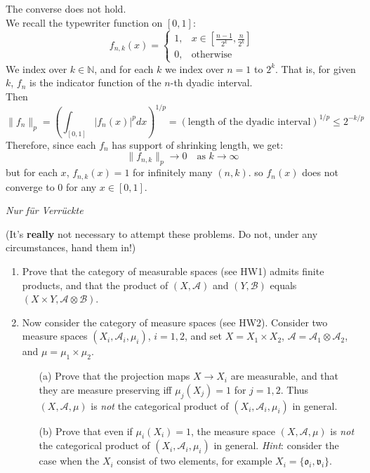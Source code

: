 \documentclass[lang=cn,11pt]{elegantbook}
\begin{document}
\begin{solution}
    The converse does not hold.\\
  We recall the typewriter function on $[0,1]$:
\[
f_{n,k}(x) = \begin{cases}
1, & x \in \left[\frac{n-1}{2^k}, \frac{n}{2^k}\right] \\
0, & \text{otherwise}
\end{cases}
\]
We index over $k \in \mathbb{N}$, and for each $k$ we index over $n=1$ to $2^k$. That is, for given $k$, \( f_n \) is the indicator function of the \( n \)-th dyadic interval.\\
Then \[
\|f_n\|_p = \left( \int_{[0,1]} |f_n(x)|^p dx \right)^{1/p} = \left( \text{length of the dyadic interval} \right)^{1/p} \le 2^{-k/p}
\]
Therefore, since each \( f_n \) has support of shrinking length, we get:
\[
\|f_{n,k}\|_p \to 0 \quad \text{as } k \to \infty
\]
but for each $x$, $f_{n,k}(x) = 1 $ for infinitely many $(n,k)$. so \( f_n(x) \) does not converge to 0 for any \( x \in [0,1] \).
  \end{solution}





\begin{center}
  \textit{Nur f\"ur Verr\"uckte}
\end{center}
(It's \textbf{really} not necessary to attempt these problems. Do not, under any circumstances, hand them in!)
\begin{enumerate}
\item Prove that the category of measurable spaces (see HW1) admits finite products, and that the product of $(X,\mathcal{A})$ and $(Y,\mathcal{B})$ equals $(X\times Y,\mathcal{A}\otimes\mathcal{B})$. 
\item  Now consider the category of measure spaces (see HW2). Consider two 
  measure spaces $(X_i,\mathcal{A}_i,\mu_i)$, $i=1,2$, and set $X=X_1\times X_2$, $\mathcal{A}=\mathcal{A}_1\otimes\mathcal{A}_2$, and $\mu=\mu_1\times\mu_2$.
  \begin{itemize}
  \item[(a)]    Prove that the projection maps $X\to X_i$ are measurable, and that they are measure preserving iff $\mu_j(X_j)=1$ for $j=1,2$. Thus $(X,\mathcal{A},\mu)$ is \emph{not} the categorical product of $(X_i,\mathcal{A}_i,\mu_i)$ in general.
  \item[(b)]    Prove that even if $\mu_i(X_i)=1$, the measure space $(X,\mathcal{A},\mu)$ is \emph{not} the categorical product of $(X_i,\mathcal{A}_i,\mu_i)$ in general.
    \textit{Hint}: consider the case when the $X_i$ consist of two elements, for example $X_i=\{\mathfrak{o}_i,\mathfrak{v}_i\}$.
  \end{itemize}
\end{enumerate}
\end{document}
